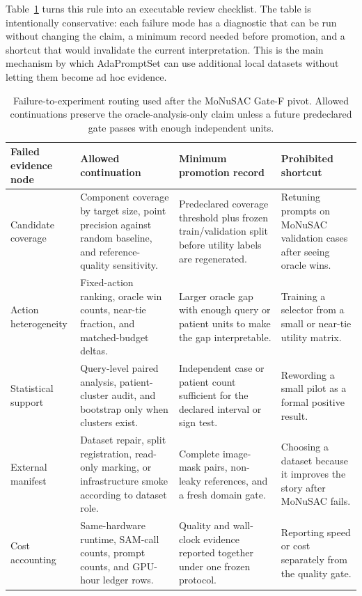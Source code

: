 Table~\ref{tab:gate-routing} turns this rule into an executable review checklist. The table is intentionally conservative: each failure mode has a diagnostic that can be run without changing the claim, a minimum record needed before promotion, and a shortcut that would invalidate the current interpretation. This is the main mechanism by which AdaPromptSet can use additional local datasets without letting them become ad hoc evidence.
\begin{table}[t]
\centering
\small
\caption{Failure-to-experiment routing used after the MoNuSAC Gate-F pivot. Allowed continuations preserve the oracle-analysis-only claim unless a future predeclared gate passes with enough independent units.}
\label{tab:gate-routing}
\begin{tabular}{@{}p{}p{}p{}p{}@{}}
\toprule
Failed evidence node & Allowed continuation & Minimum promotion record & Prohibited shortcut \\
\midrule
Candidate coverage & Component coverage by target size, point precision against random baseline, and reference-quality sensitivity. & Predeclared coverage threshold plus frozen train/validation split before utility labels are regenerated. & Retuning prompts on MoNuSAC validation cases after seeing oracle wins. \\
Action heterogeneity & Fixed-action ranking, oracle win counts, near-tie fraction, and matched-budget deltas. & Larger oracle gap with enough query or patient units to make the gap interpretable. & Training a selector from a small or near-tie utility matrix. \\
Statistical support & Query-level paired analysis, patient-cluster audit, and bootstrap only when clusters exist. & Independent case or patient count sufficient for the declared interval or sign test. & Rewording a small pilot as a formal positive result. \\
External manifest & Dataset repair, split registration, read-only marking, or infrastructure smoke according to dataset role. & Complete image-mask pairs, non-leaky references, and a fresh domain gate. & Choosing a dataset because it improves the story after MoNuSAC fails. \\
Cost accounting & Same-hardware runtime, SAM-call counts, prompt counts, and GPU-hour ledger rows. & Quality and wall-clock evidence reported together under one frozen protocol. & Reporting speed or cost separately from the quality gate. \\
\bottomrule
\end{tabular}
\end{table}

